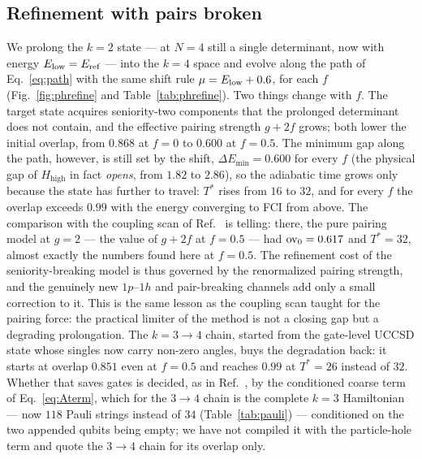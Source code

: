 \documentclass[
  aps,            %
  prc,            %
  reprint,        %
  superscriptaddress,
  floatfix,
  nofootinbib
]{revtex4-2}
\newcommand{\Hhigh}{H_{\mathrm{high}}}
\begin{document}
\subsection{Refinement with pairs broken}
\label{sec:ph-refine}
We prolong the $k=2$ state --- at $N=4$ still a single determinant, now with
energy $E_{\rm low}=E_{\rm ref}$ --- into the $k=4$ space and evolve along the
path of Eq.~\eqref{eq:path} with the same shift rule $\mu=E_{\rm low}+0.6$, for
each $f$ (Fig.~\ref{fig:phrefine} and Table~\ref{tab:phrefine}).  Two things
change with $f$.  The target state acquires seniority-two components that the
prolonged determinant does not contain, and the effective pairing strength
$g+2f$ grows; both lower the initial overlap, from $0.868$ at $f=0$ to $0.600$
at $f=0.5$.  The minimum gap along the path, however, is still set by the shift,
$\Delta E_{\min}=0.600$ for every $f$ (the physical gap of $\Hhigh$ in fact
\emph{opens}, from $1.82$ to $2.86$), so the adiabatic time grows only because
the state has further to travel: $T^{*}$ rises from $16$ to $32$, and for every
$f$ the overlap exceeds $0.99$ with the energy converging to FCI from above.
The comparison with the coupling scan of Ref.~\cite{PairingCompanion} is
telling: there, the pure pairing model at $g=2$ --- the value of $g+2f$ at
$f=0.5$ --- had ${\rm ov}_0=0.617$ and $T^{*}=32$, almost exactly the numbers
found here at $f=0.5$.  The refinement cost of the seniority-breaking model is
thus governed by the renormalized pairing strength, and the genuinely new
$1p$--$1h$ and pair-breaking channels add only a small correction to it.
This is the same lesson as the coupling scan taught for the pairing force:
the practical limiter of the method is not a closing gap but a degrading
prolongation.  The $k=3\to4$ chain, started from the gate-level UCCSD state
whose singles now carry non-zero angles, buys the degradation back: it starts
at overlap $0.851$ even at $f=0.5$ and reaches $0.99$ at $T^{*}=26$ instead
of $32$.  Whether that saves gates is decided, as in
Ref.~\cite{PairingCompanion}, by the conditioned coarse term of
Eq.~\eqref{eq:Aterm}, which for the $3\to4$ chain is the complete $k=3$
Hamiltonian --- now $118$ Pauli strings instead of $34$
(Table~\ref{tab:pauli}) --- conditioned on the two appended qubits being
empty; we have not compiled it with the particle-hole term and quote the
$3\to4$ chain for its overlap only.
\end{document}
